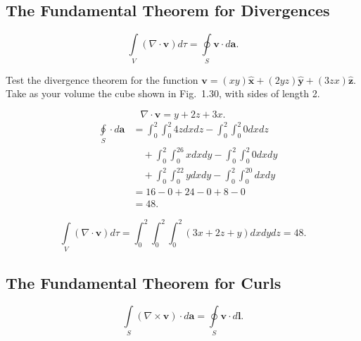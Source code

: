 \subsection{The Fundamental Theorem for Divergences}

\begin{equation}
    \underset{V}{\int}(\nabla\cdot\mathbf{v})d\tau = \underset{S}\oint\mathbf{v}\cdot d\mathbf{a}.
\end{equation}

\begin{prob}[1.33] Test the divergence theorem for the function
    $\mathbf{v} = (xy)\mathbf{\hat{x}} + (2yz)\mathbf{\hat{y}} + (3zx)\mathbf{\hat{z}}$. 
    Take as your volume the cube shown in Fig.~1.30, with sides of length 2.
\end{prob}

\begin{sol}[1.33]
    \begin{equation}
        \nabla\cdot \mathbf{v} = y + 2z + 3x.
    \end{equation}
    \begin{equation}
        \begin{aligned}
            \quad\underset{S}{\oint}\cdot d\mathbf{a}
            &= \int_0^2 \int_0^2 4z dx dz - \int_0^2 \int_0^2 0dxdz \\
            &\quad  + \int_0^2 \int_0^26xdxdy - \int_0^2 \int_0^2 0 dxdy \\
            &\quad + \int_0^2 \int_0^22y dxdy - \int_0^2\int_0^20dxdy \\
        &=16 - 0 + 24 - 0 + 8 - 0 \\
        &= 48.
        \end{aligned}
    \end{equation}

    \begin{equation}
        \underset{V}{\int}(\nabla\cdot\mathbf{v})d\tau = \int_0^2\int_0^2\int_0^2(3x + 2z + y) dxdydz = 48.
    \end{equation}
\end{sol}

\subsection{The Fundamental Theorem for Curls}
\begin{equation}
    \underset{S}{\int} (\nabla\times\mathbf{v})\cdot d\mathbf{a} = \underset{S}{\oint}\mathbf{v}\cdot d\mathbf{l}.
\end{equation}

